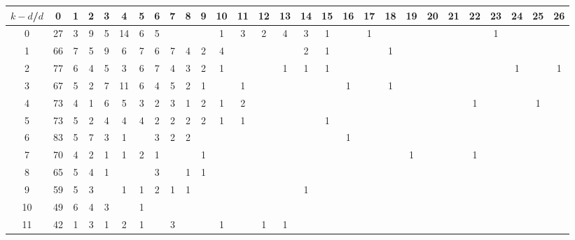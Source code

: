 \documentclass{article}
\begin{document}
\begin{table}[h]\footnotesize
{\centering
\begin{tabular}{|c|c|
c|c|c|c|c|c|c|c|c|c|c|c|c|c|c|c|c|c|c|c|c|c|c|c|c|c|}
  \hline
  $k-d$/$d$ 
 & 0 & 1 & 2 & 3 & 4 & 5 & 6 & 7 & 8 & 9 & 10 & 11 & 12 & 13 & 14 & 15 & 16 & 17 & 18 & 19 & 20 & 21 & 22 & 23 & 24 & 25 & 26\\

  \hline
  \hline

0  & 27 & 3 & 9 & 5 & 14 & 6 & 5 &  &  &  & 1 & 3 & 2 & 4 & 3 & 1 &  & 1 &  &  &  &  &  & 1 &  &  & \\

1  & 66 & 7 & 5 & 9 & 6 & 7 & 6 & 7 & 4 & 2 & 4 &  &  &  & 2 & 1 &  &  & 1 &  &  &  &  &  &  &  & \\

2  & 77 & 6 & 4 & 5 & 3 & 6 & 7 & 4 & 3 & 2 & 1 &  &  & 1 & 1 & 1 &  &  &  &  &  &  &  &  & 1 &  & 1\\

3  & 67 & 5 & 2 & 7 & 11 & 6 & 4 & 5 & 2 & 1 &  & 1 &  &  &  &  & 1 &  & 1 &  &  &  &  &  &  &  & \\

4  & 73 & 4 & 1 & 6 & 5 & 3 & 2 & 3 & 1 & 2 & 1 & 2 &  &  &  &  &  &  &  &  &  &  & 1 &  &  & 1 & \\

5  & 73 & 5 & 2 & 4 & 4 & 4 & 2 & 2 & 2 & 2 & 1 & 1 &  &  &  & 1 &  &  &  &  &  &  &  &  &  &  & \\

6  & 83 & 5 & 7 & 3 & 1 &  & 3 & 2 & 2 &  &  &  &  &  &  &  & 1 &  &  &  &  &  &  &  &  &  & \\

7  & 70 & 4 & 2 & 1 & 1 & 2 & 1 &  &  & 1 &  &  &  &  &  &  &  &  &  & 1 &  &  & 1 &  &  &  & \\

8  & 65 & 5 & 4 & 1 &  &  & 3 &  & 1 & 1 &  &  &  &  &  &  &  &  &  &  &  &  &  &  &  &  & \\

9  & 59 & 5 & 3 &  & 1 & 1 & 2 & 1 & 1 &  &  &  &  &  & 1 &  &  &  &  &  &  &  &  &  &  &  & \\

10  & 49 & 6 & 4 & 3 &  & 1 &  &  &  &  &  &  &  &  &  &  &  &  &  &  &  &  &  &  &  &  & \\

11  & 42 & 1 & 3 & 1 & 2 & 1 &  & 3 &  &  & 1 &  & 1 & 1 &  &  &  &  &  &  &  &  &  &  &  &  & \\


\end{tabular}}
\end{table}
\end{document}
